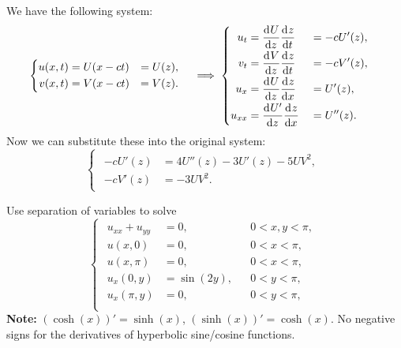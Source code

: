 \documentclass[plain]{pset}
\begin{document}
\begin{solution}
    We have the following system:
    \[
        \begin{cases}
            \begin{aligned}
                u(x, t) & = U(x - ct) & = U(z), \\
                v(x, t) & = V(x - ct) & = V(z).
            \end{aligned}
        \end{cases}
        \implies
        \begin{cases}
            \begin{aligned}
                u_t    & = \dv{U}{z}\dv{z}{t}  &  & = -cU'(z), \\
                v_t    & = \dv{V}{z}\dv{z}{t}  &  & = -cV'(z), \\
                u_x    & = \dv{U}{z}\dv{z}{x}  &  & = U'(z),   \\
                u_{xx} & = \dv{U'}{z}\dv{z}{x} &  & = U''(z).
            \end{aligned}
        \end{cases}
    \]
    Now we can substitute these into the original system:
    \[
        \begin{cases}
            \begin{aligned}
                -cU'(z) & = 4U''(z) - 3U'(z) - 5UV^2, \\
                -cV'(z) & = -3UV^2.
            \end{aligned}
        \end{cases}
    \]
\end{solution}

\pagebreak

\begin{problem}
Use separation of variables to solve
\[
    \begin{cases}
        \begin{aligned}
            u_{xx} + u_{yy} & = 0,        &  & 0 < x, y < \pi, \\
            u(x, 0)         & = 0,        &  & 0 < x < \pi,    \\
            u(x, \pi)       & = 0,        &  & 0 < x < \pi,    \\
            u_x(0, y)       & = \sin(2y), &  & 0 < y < \pi,    \\
            u_x(\pi, y)     & = 0,        &  & 0 < y < \pi,    \\
        \end{aligned}
    \end{cases}
\]
\textbf{Note:} \((\cosh(x))' = \sinh(x)\), \((\sinh(x))' = \cosh(x)\). No negative signs for the derivatives of hyperbolic sine/cosine functions.
\end{problem}
\end{document}
